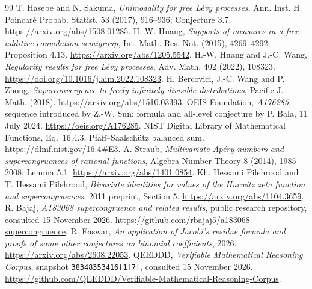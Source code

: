 \documentclass[11pt,a4paper]{article}
\numberwithin{equation}{section}
\begin{document}
\begin{thebibliography}{99}
 T. Hasebe and N. Sakuma, \emph{Unimodality for free L\'evy
processes}, Ann. Inst. H. Poincar\'e Probab. Statist. 53 (2017), 916--936;
Conjecture 3.7. \url{https://arxiv.org/abs/1508.01285}.
 H.-W. Huang, \emph{Supports of measures in a free
additive convolution semigroup}, Int. Math. Res. Not. (2015),
4269--4292; Proposition 4.13. \url{https://arxiv.org/abs/1205.5542}.
 H.-W. Huang and J.-C. Wang, \emph{Regularity results for
free L\'evy processes}, Adv. Math. 402 (2022), 108323.
\url{https://doi.org/10.1016/j.aim.2022.108323}.
 H. Bercovici, J.-C. Wang and P. Zhong,
\emph{Superconvergence to freely infinitely divisible distributions},
Pacific J. Math. (2018). \url{https://arxiv.org/abs/1510.03393}.
 OEIS Foundation, \emph{A176285}, sequence introduced
by Z.-W. Sun; formula and all-level conjecture by P. Bala,
11 July 2024. \url{https://oeis.org/A176285}.
 NIST Digital Library of Mathematical Functions,
Eq.~16.4.3, Pfaff--Saalsch\"utz balanced sum.
\url{https://dlmf.nist.gov/16.4#E3}.
 A. Straub, \emph{Multivariate Ap\'ery numbers and
supercongruences of rational functions}, Algebra Number Theory
8 (2014), 1985--2008; Lemma 5.1.
\url{https://arxiv.org/abs/1401.0854}.
 Kh. Hessami Pilehrood and T. Hessami Pilehrood,
\emph{Bivariate identities for values of the Hurwitz zeta function and
supercongruences}, 2011 preprint, Section 5.
\url{https://arxiv.org/abs/1104.3659}.
 R. Bajaj, \emph{A183068 supercongruence and related
results}, public research repository, consulted 15 November 2026.
\url{https://github.com/rbajaj5/a183068-supercongruence}.
 R. Easwar, \emph{An application of Jacobi's residue
formula and proofs of some other conjectures on binomial coefficients},
2026. \url{https://arxiv.org/abs/2608.22053}.
 QEEDDD, \emph{Verifiable Mathematical Reasoning Corpus},
snapshot \texttt{38348353416f1f7f}, consulted 15 November 2026.
\url{https://github.com/QEEDDD/Verifiable-Mathematical-Reasoning-Corpus}.
\end{thebibliography}
\end{document}
